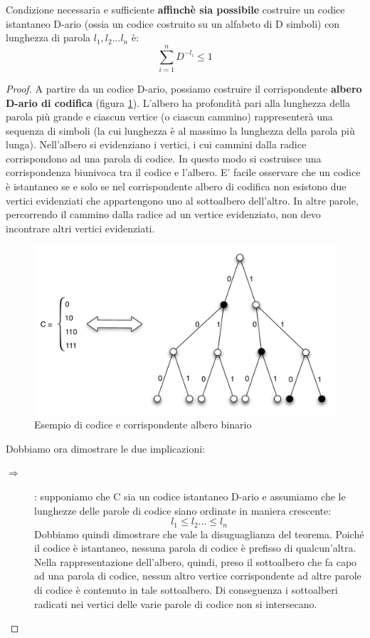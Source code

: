 \begin{teorema}
\label{kraft}
Condizione necessaria e sufficiente \textbf{affinchè sia possibile} costruire un codice istantaneo D-ario (ossia un codice costruito su un alfabeto di D simboli) con lunghezza di parola \(l_1, l_2 ... l_n\) è:
\[\sum_{i = 1}^n D^{-l_i} \leq 1\]
\begin{proof}
A partire da un codice D-ario, possiamo costruire il corrispondente \textbf{albero D-ario di codifica} (figura \ref{fig:albero}).
L'albero ha profondità pari alla lunghezza della parola più grande e ciascun vertice (o ciascun cammino) rappresenterà una sequenza 
di simboli (la cui lunghezza è al massimo la lunghezza della parola più lunga).
Nell'albero si evidenziano i vertici, i cui cammini dalla radice corrispondono ad una parola di codice.
In questo modo si costruisce una corrispondenza biunivoca tra il codice e l'albero.
E' facile osservare che un codice è istantaneo se e solo se nel corrispondente albero di codifica non esistono due vertici evidenziati che appartengono uno al sottoalbero dell'altro. In altre parole, percorrendo il cammino dalla radice ad un vertice evidenziato, non devo incontrare altri vertici evidenziati.

\begin{figure}[htbp]
\begin{center}
	\includegraphics[width=\textwidth]{img/kraft.pdf}
\caption{Esempio di codice e corrispondente albero binario}
\label{fig:albero}
\end{center}
\end{figure}

Dobbiamo ora dimostrare le due implicazioni:
\begin{description}
\item[\(\Longrightarrow\)]: supponiamo che C sia un codice istantaneo D-ario e assumiamo che le lunghezze delle parole di codice siano ordinate in maniera crescente:
\[l_1 \leq l_2 ... \leq l_n\]
Dobbiamo  quindi dimostrare che vale la disuguaglianza del teorema.
Poiché il codice è istantaneo, nessuna parola di codice è prefisso di qualcun'altra. Nella rappresentazione dell'albero, quindi, preso il sottoalbero che fa capo ad una parola di codice, nessun altro vertice corrispondente ad altre parole di codice è contenuto in tale sottoalbero. Di conseguenza i sottoalberi radicati nei vertici delle varie parole di codice non si intersecano.


\end{description}
\end{proof}
\end{teorema}
